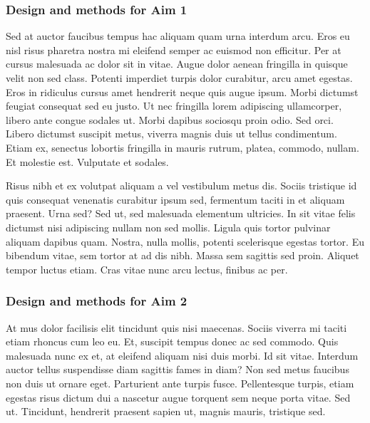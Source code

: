 \documentclass[11pt,]{article}
\begin{document}
\hypertarget{design-and-methods-for-aim-1}{%
\subsubsection{Design and methods for Aim
1}\label{design-and-methods-for-aim-1}}

Sed at auctor faucibus tempus hac aliquam quam urna interdum arcu. Eros
eu nisl risus pharetra nostra mi eleifend semper ac euismod non
efficitur. Per at cursus malesuada ac dolor sit in vitae. Augue dolor
aenean fringilla in quisque velit non sed class. Potenti imperdiet
turpis dolor curabitur, arcu amet egestas. Eros in ridiculus cursus amet
hendrerit neque quis augue ipsum. Morbi dictumst feugiat consequat sed
eu justo. Ut nec fringilla lorem adipiscing ullamcorper, libero ante
congue sodales ut. Morbi dapibus sociosqu proin odio. Sed orci. Libero
dictumst suscipit metus, viverra magnis duis ut tellus condimentum.
Etiam ex, senectus lobortis fringilla in mauris rutrum, platea, commodo,
nullam. Et molestie est. Vulputate et sodales.

Risus nibh et ex volutpat aliquam a vel vestibulum metus dis. Sociis
tristique id quis consequat venenatis curabitur ipsum sed, fermentum
taciti in et aliquam praesent. Urna sed? Sed ut, sed malesuada elementum
ultricies. In sit vitae felis dictumst nisi adipiscing nullam non sed
mollis. Ligula quis tortor pulvinar aliquam dapibus quam. Nostra, nulla
mollis, potenti scelerisque egestas tortor. Eu bibendum vitae, sem
tortor at ad dis nibh. Massa sem sagittis sed proin. Aliquet tempor
luctus etiam. Cras vitae nunc arcu lectus, finibus ac per.

\hypertarget{design-and-methods-for-aim-2}{%
\subsubsection{Design and methods for Aim
2}\label{design-and-methods-for-aim-2}}

At mus dolor facilisis elit tincidunt quis nisi maecenas. Sociis viverra
mi taciti etiam rhoncus cum leo eu. Et, suscipit tempus donec ac sed
commodo. Quis malesuada nunc ex et, at eleifend aliquam nisi duis morbi.
Id sit vitae. Interdum auctor tellus suspendisse diam sagittis fames in
diam? Non sed metus faucibus non duis ut ornare eget. Parturient ante
turpis fusce. Pellentesque turpis, etiam egestas risus dictum dui a
nascetur augue torquent sem neque porta vitae. Sed ut. Tincidunt,
hendrerit praesent sapien ut, magnis mauris, tristique sed.
\end{document}
